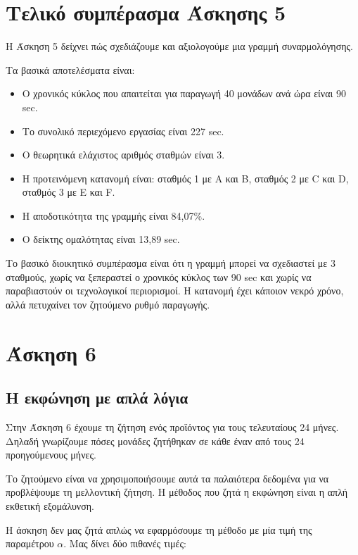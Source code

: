 \documentclass[12pt,a4paper]{article}
\begin{document}
\section{Τελικό συμπέρασμα Άσκησης 5}

Η Άσκηση 5 δείχνει πώς σχεδιάζουμε και αξιολογούμε μια γραμμή συναρμολόγησης.

Τα βασικά αποτελέσματα είναι:

\begin{itemize}
    \item Ο χρονικός κύκλος που απαιτείται για παραγωγή 40 μονάδων ανά ώρα είναι 90 sec.
    \item Το συνολικό περιεχόμενο εργασίας είναι 227 sec.
    \item Ο θεωρητικά ελάχιστος αριθμός σταθμών είναι 3.
    \item Η προτεινόμενη κατανομή είναι: σταθμός 1 με A και B, σταθμός 2 με C και D, σταθμός 3 με E και F.
    \item Η αποδοτικότητα της γραμμής είναι 84,07\%.
    \item Ο δείκτης ομαλότητας είναι 13,89 sec.
\end{itemize}

Το βασικό διοικητικό συμπέρασμα είναι ότι η γραμμή μπορεί να σχεδιαστεί με 3 σταθμούς, χωρίς να ξεπεραστεί ο χρονικός κύκλος των 90 sec και χωρίς να παραβιαστούν οι τεχνολογικοί περιορισμοί. Η κατανομή έχει κάποιον νεκρό χρόνο, αλλά πετυχαίνει τον ζητούμενο ρυθμό παραγωγής.

\newpage

\section{Άσκηση 6}

\subsection{Η εκφώνηση με απλά λόγια}

Στην Άσκηση 6 έχουμε τη ζήτηση ενός προϊόντος για τους τελευταίους 24 μήνες. Δηλαδή γνωρίζουμε πόσες μονάδες ζητήθηκαν σε κάθε έναν από τους 24 προηγούμενους μήνες.

Το ζητούμενο είναι να χρησιμοποιήσουμε αυτά τα παλαιότερα δεδομένα για να προβλέψουμε τη μελλοντική ζήτηση. Η μέθοδος που ζητά η εκφώνηση είναι η απλή εκθετική εξομάλυνση.

Η άσκηση δεν μας ζητά απλώς να εφαρμόσουμε τη μέθοδο με μία τιμή της παραμέτρου \(\alpha\). Μας δίνει δύο πιθανές τιμές:
\end{document}
